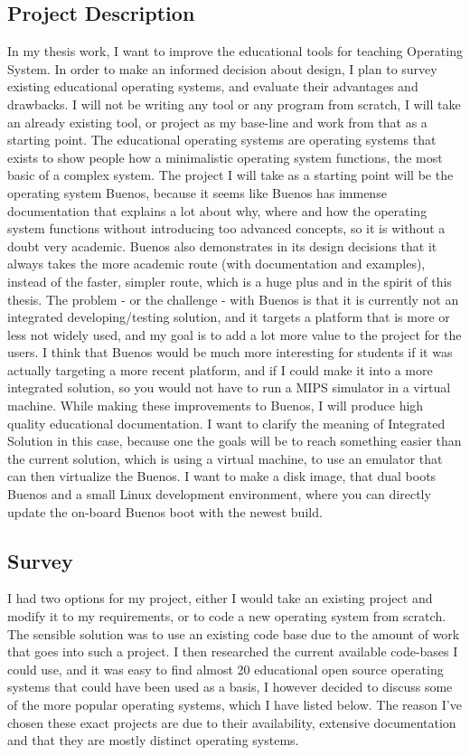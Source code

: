 \subsection{Project Description}
In my thesis work, I want to improve the educational tools for teaching Operating System. In order to make an informed decision about design, I plan to survey existing educational operating systems, and evaluate their advantages and drawbacks. I will not be writing any tool or any program from scratch, I will take an already existing tool, or project as my base-line and work from that as a starting point.
The educational operating systems are operating systems that exists to show people how a minimalistic operating system functions, the most basic of a complex system.
The project I will take as a starting point will be the operating system Buenos, because it seems like Buenos has immense documentation that explains a lot about why, where and how the operating system functions without introducing too advanced concepts, so it is without a doubt very academic.
Buenos also demonstrates in its design decisions that it always takes the more academic route (with documentation and examples), instead of the faster, simpler route, which is a huge plus and in the spirit of this thesis. The problem - or the challenge - with Buenos is that it is currently not an integrated developing/testing solution, and it targets a platform that is more or less not widely used, and my goal is to add a lot more value to the project for the users. I think that Buenos would be much more interesting for students if it was actually targeting a more recent platform, and if I could make it into a more integrated solution, so you would not have to run a MIPS simulator in a virtual machine. While making these improvements to Buenos, I will produce high quality educational documentation.
I want to clarify the meaning of Integrated Solution in this case, because one the goals will be to reach something easier than the current solution, which is using a virtual machine, to use an emulator that can then virtualize the Buenos. I want to make a disk image, that dual boots Buenos and a small Linux development environment, where you can directly update the on-board Buenos boot with the newest build.

\pagebreak
\subsection{Survey}

I had two options for my project, either I would take an existing project and modify it to my requirements, or to code a new operating system from scratch. The sensible solution was to use an existing code base due to the amount of work that goes into such a project. I then researched the current available code-bases I could use, and it was easy to find almost 20 educational open source operating systems that could have been used as a basis, I however decided to discuss some of the more popular operating systems, which I have listed below.
The reason I've chosen these exact projects are due to their availability, extensive documentation and that they are mostly distinct operating systems.

